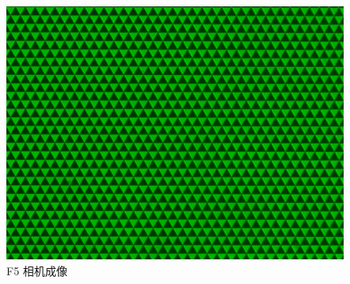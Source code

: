 \documentclass{ctexart}
\begin{document}
\begin{figure}[H]
\begin{minipage}[b]{0.3\textwidth}
    \includegraphics[width=\textwidth]{pictures/F5-nomask.png}
    \caption{F5 相机成像}
  \end{minipage}
\end{figure}
\end{document}
